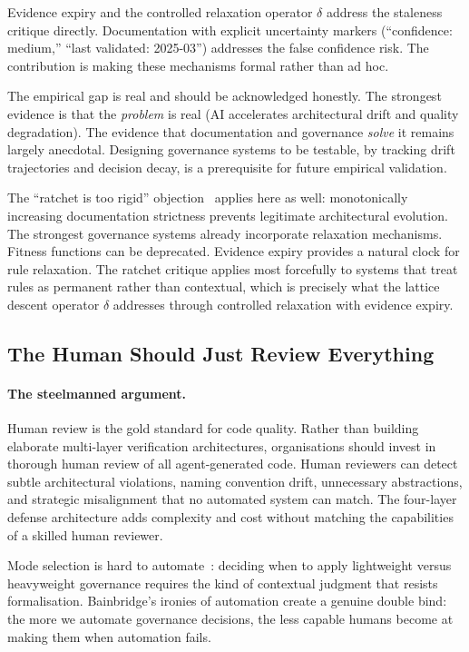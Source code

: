 \documentclass[11pt, a4paper]{googledeepmind}
\begin{document}
Evidence expiry and the controlled relaxation operator $\delta$ address the staleness critique directly. Documentation with explicit uncertainty markers (``confidence: medium,'' ``last validated: 2025-03'') addresses the false confidence risk. The contribution is making these mechanisms formal rather than ad hoc.

The empirical gap is real and should be acknowledged honestly. The strongest evidence is that the \emph{problem} is real (AI accelerates architectural drift and quality degradation). The evidence that documentation and governance \emph{solve} it remains largely anecdotal. Designing governance systems to be testable, by tracking drift trajectories and decision decay, is a prerequisite for future empirical validation.

The ``ratchet is too rigid'' objection~\citep{ford2017} applies here as well: monotonically increasing documentation strictness prevents legitimate architectural evolution. The strongest governance systems already incorporate relaxation mechanisms. Fitness functions can be deprecated. Evidence expiry provides a natural clock for rule relaxation. The ratchet critique applies most forcefully to systems that treat rules as permanent rather than contextual, which is precisely what the lattice descent operator $\delta$ addresses through controlled relaxation with evidence expiry.


\subsection{The Human Should Just Review Everything}
\label{sec:contrarian-human}

\paragraph{The steelmanned argument.}
Human review is the gold standard for code quality. Rather than building elaborate multi-layer verification architectures, organisations should invest in thorough human review of all agent-generated code. Human reviewers can detect subtle architectural violations, naming convention drift, unnecessary abstractions, and strategic misalignment that no automated system can match. The four-layer defense architecture adds complexity and cost without matching the capabilities of a skilled human reviewer.

Mode selection is hard to automate~\citep{bainbridge1983ironies}: deciding when to apply lightweight versus heavyweight governance requires the kind of contextual judgment that resists formalisation. Bainbridge's ironies of automation create a genuine double bind: the more we automate governance decisions, the less capable humans become at making them when automation fails.
\end{document}
